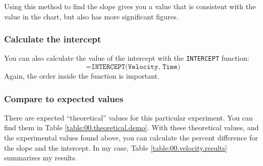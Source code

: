 Using this method to find the slope gives you a value that is consistent with the value in the chart, but also has more significant figures.
\subsubsection{Calculate the intercept}
You can also calculate the value of the intercept with the \texttt{INTERCEPT} function:
\begin{equation}
    \texttt{=INTERCEPT(Velocity, Time)}
\end{equation}
Again, the order inside the function is important.
\subsubsection{Compare to expected values}
There are expected ``theoretical'' values for this particular experiment. You can find them in Table \ref{table:00.theoretical.demo}. With these theoretical values, and the experimental values found above, you can calculate the percent difference for the slope and the intercept. In my case, Table \ref{table:00.velocity.results} summarizes my results.
\begin{center}
\end{center}
